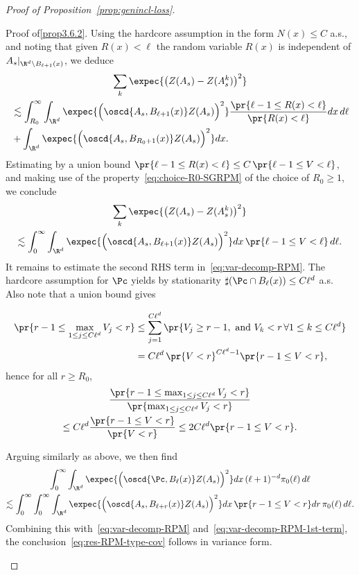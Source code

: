\begin{proof}[Proof of Proposition~\ref{prop:genincl-loss}]
\begin{step}{Proof of\eqref{prop3.6.2}.}
Using the hardcore assumption in the form $N(x)\le C$ a.s., and noting that given $R(x)<\ell$ the random variable $R(x)$ is independent of $A_s|_{\R^d\setminus B_{\ell+1}(x)}$, we deduce
\begin{multline*}
\sum_{k}\expec{\big(Z(A_s)-Z(A_s^k)\big)^2} \\
\begin{aligned}
&\lesssim\int_{R_0}^\infty\int_{\R^d}\expec{\Big(\oscd{A_s,B_{\ell+1}(x)}Z(A_s)\Big)^2}\frac{\pr{\ell-1\le R(x)<\ell}}{\pr{R(x)<\ell}}dx\,d\ell\\
&+\int_{\R^d}\expec{\Big(\oscd{A_s,B_{R_0+1}(x)}Z(A_s)\Big)^2}dx.
\end{aligned}
\end{multline*}
Estimating by a union bound $\pr{\ell-1\le R(x)<\ell}\le C\,\pr{\ell-1\le V<\ell}$, and making use of the property~\eqref{eq:choice-R0-SGRPM} of the choice of $R_0\ge1$, we conclude
\begin{multline}\label{eq:var-decomp-RPM-1st-term}
{\sum_{k}\expec{\big(Z(A_s)-Z(A_s^k)\big)^2}}\\
\lesssim \int_{0}^\infty\int_{\R^d}\expec{\Big(\oscd{A_s,B_{\ell+1}(x)}Z(A_s)\Big)^2}dx\,\pr{\ell-1\le V<\ell}\,d\ell.
\end{multline}
It remains to estimate the second RHS term in~\eqref{eq:var-decomp-RPM}. The hardcore assumption for $\Pc$ yields by stationarity $\sharp(\Pc\cap B_{\ell}(x))\le C\ell^d$ a.s. Also note that a union bound gives

\begin{align*}
{\pr{r-1\le \max_{1\le j\le C\ell^d}V_j<r}}&\le \sum_{j=1}^{C\ell^d}\pr{V_j\ge r-1,\text{ and }V_k<r\,\forall 1\le k\le C\ell^d}\\*
&= C\ell^d\,\pr{V<r}^{C\ell^d-1}\pr{r-1\le V<r},
\end{align*}
hence for all $r\ge R_0$,
\begin{multline*}
\frac{\pr{r-1\le \max_{1\le j\le C\ell^d}V_j<r}}{\pr{\max_{1\le j\le C\ell^d}V_j<r}}\\
\le C\ell^d\frac{\pr{r-1\le V<r}}{\pr{V<r}}\le 2C\ell^d\pr{r-1\le V<r}.
\end{multline*}


Arguing similarly as above, we then find
\begin{multline*}
{\int_0^\infty\int_{\R^d}\expec{\Big(\oscd{\Pc,B_\ell(x)}Z(A_s)\Big)^2}dx\,(\ell+1)^{-d}\pi_0(\ell)\,d\ell}\\
\lesssim \int_0^\infty\int_{0}^\infty\int_{\R^d}\expec{\Big(\oscd{A_s,B_{\ell+r}(x)}Z(A_s)\Big)^2}dx\,\pr{r-1\le V<r}dr\,\pi_0(\ell)\,d\ell.
\end{multline*}
Combining this with~\eqref{eq:var-decomp-RPM} and~\eqref{eq:var-decomp-RPM-1st-term}, the conclusion~\eqref{eq:res-RPM-type-cov} follows in variance form.
\end{step}
\end{proof}



